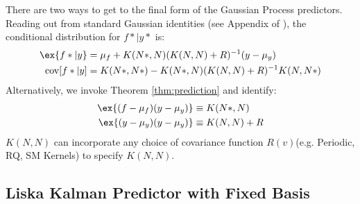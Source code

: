 There are two ways to get to the final form of the Gaussian Process predictors. Reading out from standard Gaussian identities (see Appendix of \cite{rasmussen2006gaussian}), the conditional distribution for $f*|y*$ is:
\begin{align}
\ex{f*|y} &= \mu_f + K(N*,N)(K(N,N) + R )^{-1} (y - \mu_y) \\
\text{cov}[f*|y] &= K(N*,N*) - K(N*,N)(K(N,N) + R)^{-1}K(N,N*) 
\end{align}
Alternatively, we invoke Theorem \ref{thm:prediction} and identify:
\begin{align}
\ex{(f - \mu_f)(y - \mu_y)} &\equiv K(N*,N) \\
\ex{(y - \mu_y)(y - \mu_y)} &\equiv K(N,N) + R 
\end{align}
$K(N,N)$ can incorporate any choice of covariance function $R(v)$(e.g. Periodic, RQ, SM Kernels) to specify $K(N,N)$.

\subsection{Liska Kalman Predictor with Fixed Basis} \label{sec:ap_liska_deriv}

